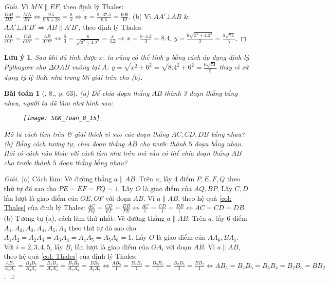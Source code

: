 \documentclass{article}
\newtheorem{baitoan}{Bài toán}
\newtheorem{luuy}{Lưu ý}
\begin{document}
\begin{proof}[Giải]
	Vì $MN\parallel EF$, theo định lý Thales: $\frac{DM}{DE} = \frac{MN}{EF}\Leftrightarrow\frac{9.5}{9.5 + 28} = \frac{8}{x}\Leftrightarrow x = \frac{8\cdot37.5}{9.5} = \frac{600}{19}$. (b) Vì $AA'\bot AB$ \& $AA'\bot A'B'\Rightarrow AB\parallel A'B'$, theo định lý Thales: $\frac{OA}{OA'} = \frac{OB}{OB'} = \frac{AB}{A'B'}\Leftrightarrow\frac{6}{3} = \frac{y}{\sqrt{3^2 + 4.2^2}} = \frac{x}{4.2}\Rightarrow x = \frac{6\cdot4.2}{3} = 8.4$, $y = \frac{6\sqrt{3^2 + 4.2^2}}{3} = \frac{6\sqrt{74}}{5}$.
\end{proof}

\begin{luuy}
	Sau khi đã tính được $x$, ta cũng có thể tính $y$ bằng cách áp dụng định lý Pythagore cho $\Delta OAB$ vuông tại $A$: $y = \sqrt{x^2 + 6^2} = \sqrt{8.4^2 + 6^2} = \frac{6\sqrt{74}}{5}$ thay vì sử dụng tỷ lệ thức như trong lời giải trên cho (b).
\end{luuy}

\begin{baitoan}[\cite{SGK_Toan_8_tap_2}, 8., p. 63]
	(a) Để chia đoạn thẳng $AB$ thành 3 đoạn thẳng bằng nhau, người ta đã làm như hình sau:
	\begin{figure}[H]
		\centering
		\texttt{[image: SGK\_Toan\_8\_15]}
	\end{figure}
	\noindent Mô tả cách làm trên \& giải thích vì sao các đoạn thẳng $AC,CD,DB$ bằng nhau? (b) Bằng cách tương tự, chia đoạn thẳng $AB$ cho trước thành $5$ đoạn bằng nhau. Hỏi có cách nào khác với cách làm như trên mà vẫn có thể chia đoạn thẳng $AB$ cho trước thành $5$ đoạn thẳng bằng nhau?
\end{baitoan}

\begin{proof}[Giải]
	(a) Cách làm: Vẽ đường thẳng $a\parallel AB$. Trên $a$, lấy 4 điểm $P,E,F,Q$ theo thứ tự đó sao cho $PE = EF = FQ = 1$. Lấy $O$ là giao điểm của $AQ,BP$. Lấy $C,D$ lần lượt là giao điểm của $OE,OF$ với đoạn $AB$. Vì $a\parallel AB$, theo hệ quả \ref{col: Thales} của định lý Thales: $\frac{AC}{FQ} = \frac{CD}{EF} = \frac{DB}{PE}\Leftrightarrow\frac{AC}{1} = \frac{CD}{1} = \frac{DB}{1}\Leftrightarrow AC = CD = DB$. (b) Tương tự (a), cách làm thứ nhất: Vẽ đường thẳng $a\parallel AB$. Trên $a$, lấy 6 điểm $A_1,A_2,A_3,A_4,A_5,A_6$ theo thứ tự đó sao cho $A_1A_2 = A_2A_3 = A_3A_4 = A_4A_5 = A_5A_6 = 1$. Lấy $O$ là giao điểm của $AA_6,BA_1$. Với $i = 2,3,4,5$, lấy $B_i$ lần lượt là giao điểm của $OA_i$ với đoạn $AB$. Vì $a\parallel AB$, theo hệ quả \ref{col: Thales} của định lý Thales: $\frac{AB_5}{A_5A_6} = \frac{B_4B_5}{A_4A_5} = \frac{B_3B_4}{A_3A_4} = \frac{B_2B_3}{A_2A_3} = \frac{BB_2}{A_1A_2}\Leftrightarrow\frac{AB_5}{1} = \frac{B_4B_5}{1} = \frac{B_3B_4}{1} = \frac{B_2B_3}{1} = \frac{BB_2}{1}\Leftrightarrow AB_5 = B_4B_5 = B_3B_4 = B_2B_3 = BB_2$.
\end{proof}
\end{document}
